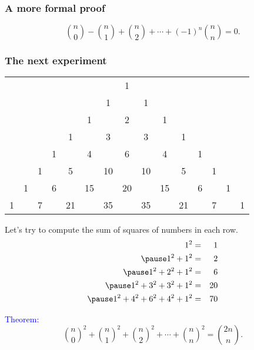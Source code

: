 \begin{frame}\frametitle{A more formal proof}
  \begin{tcolorbox}
    \[
    {n\choose 0} - {n\choose 1} + {n\choose 2} +\cdots +(-1)^{n}{n\choose n} = 0.
    \]
  \end{tcolorbox}
  \vspace{2in}
\end{frame}

\begin{frame}\frametitle{The next experiment}
  \begin{tcolorbox}
    {\footnotesize
      \begin{tabular}{ccccccccccccccc}
        & & & & & & & 1 & & & & & & & \\
        & & & & & & 1 & & 1 & & & & & & \\
        & & & & & 1 & & 2 & & 1 & & & & & \\
        & & & & 1 & & 3 & & 3 & & 1 & & & & \\
        & & & 1 & & 4 & & 6 & & 4 & & 1 & & & \\
        & & 1 & & 5 & & 10 & & 10 & & 5 & & 1 & & \\
        & 1 & & 6 & & 15 & & 20 & & 15 & & 6 & & 1 & \\
        1 & & 7 & & 21 & & 35 & & 35 & & 21 & & 7 & & 1 \\
      \end{tabular}
    }
  \end{tcolorbox}

  Let's try to compute the sum of squares of numbers in each row.
  \begin{eqnarray*}
    1^2 &=& 1\\ \pause
    1^2 + 1^2 &=& 2 \\ \pause
    1^2 + 2^2 + 1^2 &=& 6 \\ \pause
    1^2 + 3^2 + 3^2 + 1^2 &=& 20 \\ \pause
    1^2 + 4^2 + 6^2 + 4^2 + 1^2 &=& 70 \\
  \end{eqnarray*}
\end{frame}

\begin{frame}
  \textcolor{blue}{Theorem:}
  \[
  \binom{n}{0}^2 + \binom{n}{1}^2 + \binom{n}{2}^2 + \cdots+ \binom{n}{n}^2
  = \binom{2n}{n}.
  \]
  \vspace{2.5in}
\end{frame}

